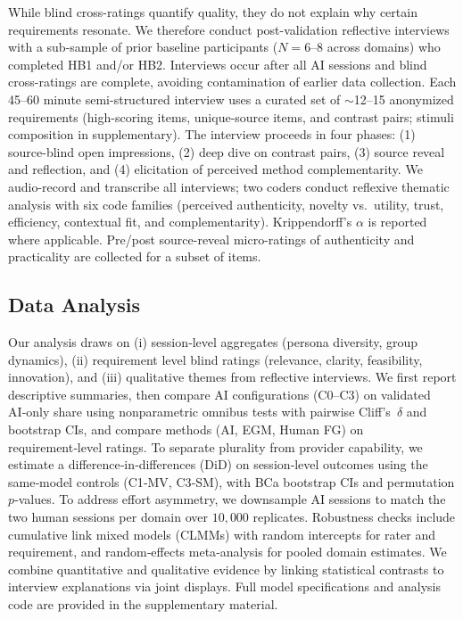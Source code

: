 \documentclass[acmsmall]{acmart}
\begin{document}
While blind cross-ratings quantify quality, they do not explain why certain requirements resonate. We therefore conduct post-validation reflective interviews with a sub-sample of prior baseline participants (\(N=6\)--8 across domains) who completed HB1 and/or HB2. Interviews occur after all AI sessions and blind cross-ratings are complete, avoiding contamination of earlier data collection. Each 45--60 minute semi-structured interview uses a curated set of $\sim$12--15 anonymized requirements (high-scoring items, unique-source items, and contrast pairs; stimuli composition in supplementary). The interview proceeds in four phases: (1) source-blind open impressions, (2) deep dive on contrast pairs, (3) source reveal and reflection, and (4) elicitation of perceived method complementarity. We audio-record and transcribe all interviews; two coders conduct reflexive thematic analysis with six code families (perceived authenticity, novelty vs.\ utility, trust, efficiency, contextual fit, and complementarity). Krippendorff's \(\alpha\) is reported where applicable. Pre/post source-reveal micro-ratings of authenticity and practicality are collected for a subset of items.


\subsection{Data Analysis}
\label{sec:analysis-plan}
Our analysis draws on (i) session‑level aggregates (persona diversity, group dynamics), (ii) requirement level blind ratings (relevance, clarity, feasibility, innovation), and (iii) qualitative themes from reflective interviews. We first report descriptive summaries, then compare AI configurations (C0--C3) on validated AI‑only share using nonparametric omnibus tests with pairwise Cliff's~$\delta$ and bootstrap CIs, and compare methods (AI, EGM, Human FG) on requirement‑level ratings. To separate plurality from provider capability, we estimate a difference‑in‑differences (DiD) on session‑level outcomes using the same‑model controls (C1‑MV, C3‑SM), with BCa bootstrap CIs and permutation $p$‑values. To address effort asymmetry, we downsample AI sessions to match the two human sessions per domain over $10{,}000$ replicates. Robustness checks include cumulative link mixed models (CLMMs) with random intercepts for rater and requirement, and random‑effects meta‑analysis for pooled domain estimates. We combine quantitative and qualitative evidence by linking statistical contrasts to interview explanations via joint displays. Full model specifications and analysis code are provided in the supplementary material.
\end{document}
